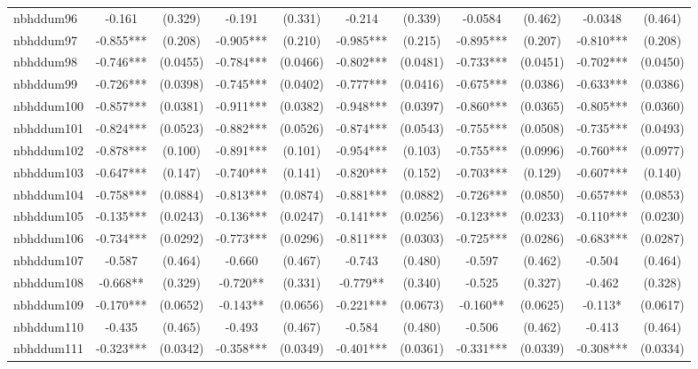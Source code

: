\documentclass[]{article}
\begin{document}
\begin{tabular}{lcccccccccc}
nbhddum96 & -0.161 & (0.329) & -0.191 & (0.331) & -0.214 & (0.339) & -0.0584 & (0.462) & -0.0348 & (0.464) \\
nbhddum97 & -0.855*** & (0.208) & -0.905*** & (0.210) & -0.985*** & (0.215) & -0.895*** & (0.207) & -0.810*** & (0.208) \\
nbhddum98 & -0.746*** & (0.0455) & -0.784*** & (0.0466) & -0.802*** & (0.0481) & -0.733*** & (0.0451) & -0.702*** & (0.0450) \\
nbhddum99 & -0.726*** & (0.0398) & -0.745*** & (0.0402) & -0.777*** & (0.0416) & -0.675*** & (0.0386) & -0.633*** & (0.0386) \\
nbhddum100 & -0.857*** & (0.0381) & -0.911*** & (0.0382) & -0.948*** & (0.0397) & -0.860*** & (0.0365) & -0.805*** & (0.0360) \\
nbhddum101 & -0.824*** & (0.0523) & -0.882*** & (0.0526) & -0.874*** & (0.0543) & -0.755*** & (0.0508) & -0.735*** & (0.0493) \\
nbhddum102 & -0.878*** & (0.100) & -0.891*** & (0.101) & -0.954*** & (0.103) & -0.755*** & (0.0996) & -0.760*** & (0.0977) \\
nbhddum103 & -0.647*** & (0.147) & -0.740*** & (0.141) & -0.820*** & (0.152) & -0.703*** & (0.129) & -0.607*** & (0.140) \\
nbhddum104 & -0.758*** & (0.0884) & -0.813*** & (0.0874) & -0.881*** & (0.0882) & -0.726*** & (0.0850) & -0.657*** & (0.0853) \\
nbhddum105 & -0.135*** & (0.0243) & -0.136*** & (0.0247) & -0.141*** & (0.0256) & -0.123*** & (0.0233) & -0.110*** & (0.0230) \\
nbhddum106 & -0.734*** & (0.0292) & -0.773*** & (0.0296) & -0.811*** & (0.0303) & -0.725*** & (0.0286) & -0.683*** & (0.0287) \\
nbhddum107 & -0.587 & (0.464) & -0.660 & (0.467) & -0.743 & (0.480) & -0.597 & (0.462) & -0.504 & (0.464) \\
nbhddum108 & -0.668** & (0.329) & -0.720** & (0.331) & -0.779** & (0.340) & -0.525 & (0.327) & -0.462 & (0.328) \\
nbhddum109 & -0.170*** & (0.0652) & -0.143** & (0.0656) & -0.221*** & (0.0673) & -0.160** & (0.0625) & -0.113* & (0.0617) \\
nbhddum110 & -0.435 & (0.465) & -0.493 & (0.467) & -0.584 & (0.480) & -0.506 & (0.462) & -0.413 & (0.464) \\
nbhddum111 & -0.323*** & (0.0342) & -0.358*** & (0.0349) & -0.401*** & (0.0361) & -0.331*** & (0.0339) & -0.308*** & (0.0334) \\

\end{tabular}
\end{document}
